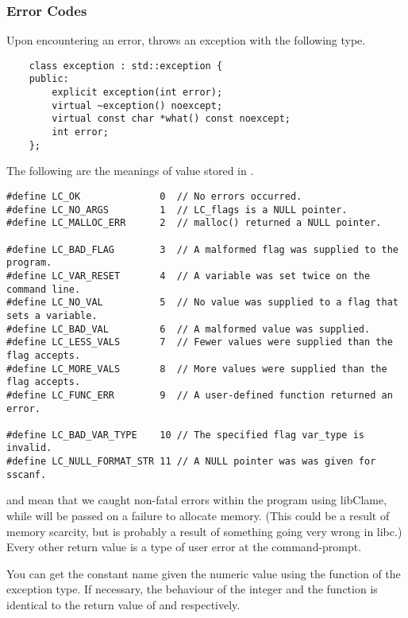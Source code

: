 \subsubsection{Error Codes}

Upon encountering an error,  throws an exception with the following type.

\begin{verbatim}
	class exception : std::exception {
	public:
		explicit exception(int error);
		virtual ~exception() noexcept;
		virtual const char *what() const noexcept;
		int error;
	};
\end{verbatim}

The following are the meanings of value stored in .

\begin{verbatim}
#define LC_OK              0  // No errors occurred.
#define LC_NO_ARGS         1  // LC_flags is a NULL pointer.
#define LC_MALLOC_ERR      2  // malloc() returned a NULL pointer.

#define LC_BAD_FLAG        3  // A malformed flag was supplied to the program.
#define LC_VAR_RESET       4  // A variable was set twice on the command line.
#define LC_NO_VAL          5  // No value was supplied to a flag that sets a variable.
#define LC_BAD_VAL         6  // A malformed value was supplied.
#define LC_LESS_VALS       7  // Fewer values were supplied than the flag accepts.
#define LC_MORE_VALS       8  // More values were supplied than the flag accepts.
#define LC_FUNC_ERR        9  // A user-defined function returned an error.

#define LC_BAD_VAR_TYPE    10 // The specified flag var_type is invalid.
#define LC_NULL_FORMAT_STR 11 // A NULL pointer was was given for sscanf.
\end{verbatim}

 and  mean that we caught non-fatal errors within the program using libClame, while  will be passed on a failure to allocate memory. (This could be a result of memory scarcity, but is probably a result of something going very wrong in libc.) Every other return value is a type of user error at the command-prompt.

You can get the constant name given the numeric value using the  function of the exception type. If necessary, the behaviour of the  integer and the  function is identical to the return value of  and  respectively.


